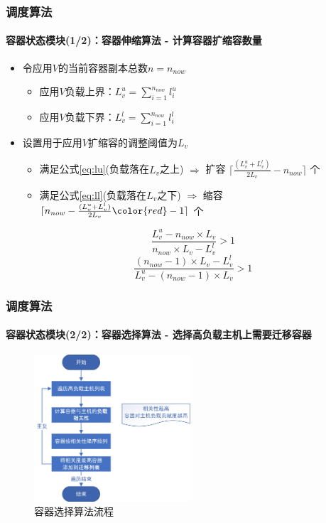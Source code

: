 \begin{frame}
\frametitle{调度算法}
\framesubtitle{容器状态模块(1/2)：容器伸缩算法 - 计算容器扩缩容数量}
\begin{itemize}
    \item 令应用$V$的当前容器副本总数$n=n_{now}$
    \begin{itemize}
        \item 应用$V$负载上界：$L_v^u = \sum_{i=1}^{n_{now}}l_i^u$
        \item 应用$V$负载下界：$L_v^l = \sum_{i=1}^{n_{now}}l_i^l$
    \end{itemize}
    \item 设置用于应用$V$扩缩容的调整阈值为$L_v$
        \begin{itemize}
            \item 满足公式\ref{eq:lu}(负载落在$L_v$之上) $\Rightarrow$ 扩容 $\lceil \frac{(L_v^u+L_v^l)}{2L_v} - n_{now} \rceil$ 个
            \item 满足公式\ref{eq:ll}(负载落在$L_v$之下)  $\Rightarrow$ 缩容$\lceil n_{now} - \frac{(L_v^u+L_v^l)}{2L_v} {\color{red} - 1}\rceil$ 个
        \end{itemize}
    \begin{equation}
        \frac{L_v^u - n_{now} \times L_v}{n_{now} \times L_v - L^l_v} > 1
        \label{eq:lu}
    \end{equation}
    \begin{equation}
        \frac{(n_{now} - 1) \times L_v - L_v^l}{L_v^u - (n_{now} - 1) \times L_v} > 1
        \label{eq:ll}
    \end{equation}
\end{itemize}
\end{frame}

\begin{frame}
\frametitle{调度算法}
\framesubtitle{容器状态模块(2/2)：容器选择算法 - 选择高负载主机上需要迁移容器}
\begin{figure}[htb]
    \centering
    \includegraphics[width=0.52\textwidth]{figures/fig_4_1.jpg}
    \caption{容器选择算法流程}
    \label{fig:fig_4_1}
\end{figure}
\bigskip
\end{frame}

